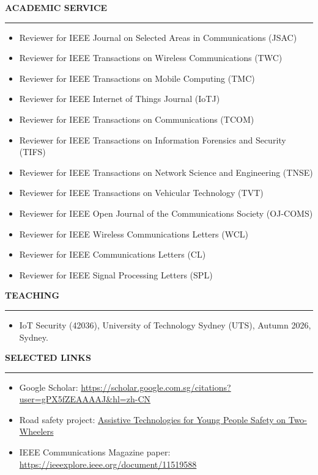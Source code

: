 \documentclass[10pt,a4paper]{article}
\newcommand{\sectionrule}[1]{
  \vspace{0.55em}
  {\large\bfseries #1\par}
  \vspace{0.20em}
  \hrule
  \vspace{0.45em}
}
\begin{document}
\sectionrule{ACADEMIC SERVICE}
\begin{itemize}
  \item Reviewer for IEEE Journal on Selected Areas in Communications (JSAC)
  \item Reviewer for IEEE Transactions on Wireless Communications (TWC)
  \item Reviewer for IEEE Transactions on Mobile Computing (TMC)
  \item Reviewer for IEEE Internet of Things Journal (IoTJ)
  \item Reviewer for IEEE Transactions on Communications (TCOM)
  \item Reviewer for IEEE Transactions on Information Forensics and Security (TIFS)
  \item Reviewer for IEEE Transactions on Network Science and Engineering (TNSE)
  \item Reviewer for IEEE Transactions on Vehicular Technology (TVT)
  \item Reviewer for IEEE Open Journal of the Communications Society (OJ-COMS)
  \item Reviewer for IEEE Wireless Communications Letters (WCL)
  \item Reviewer for IEEE Communications Letters (CL)
  \item Reviewer for IEEE Signal Processing Letters (SPL)
\end{itemize}

\sectionrule{TEACHING}
\begin{itemize}
  \item IoT Security (42036), University of Technology Sydney (UTS), Autumn 2026, Sydney.
\end{itemize}

\sectionrule{SELECTED LINKS}
\begin{itemize}
  \item Google Scholar: \href{https://scholar.google.com.sg/citations?user=gPX5fZEAAAAJ\&hl=zh-CN}{https://scholar.google.com.sg/citations?user=gPX5fZEAAAAJ\&hl=zh-CN}
  \item Road safety project: \href{https://researchprofiles.canberra.edu.au/en/projects/assistive-technologies-for-young-people-safety-on-two-wheelers/}{Assistive Technologies for Young People Safety on Two-Wheelers}
  \item IEEE Communications Magazine paper: \href{https://ieeexplore.ieee.org/document/11519588}{https://ieeexplore.ieee.org/document/11519588}
\end{itemize}
\end{document}
